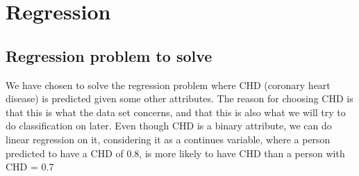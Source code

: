 \section{Regression}
\subsection{Regression problem to solve}
We have chosen to solve the regression problem where CHD (coronary heart disease) is predicted given some other attributes. The reason for choosing CHD is that this is what the data set concerns, and that this is also what we will try to do classification on later.
Even though CHD is a binary attribute, we can do linear regression on it, considering it as a continues variable, where a person predicted to have a CHD of 0.8, is more likely to have CHD than a person with CHD = 0.7